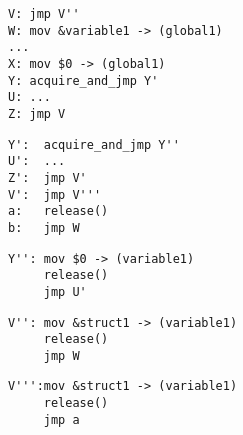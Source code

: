 \documentclass[10pt,letter,twocolumn]{sigplanconf}
\makeatletter
\newenvironment{subfloat}%
    {\def\caption##1{\gdef\subcapsave{\relax##1}}%
     \let\subcapsave=\@empty %
     \let\sf@oldlabel=\label
     \def\label##1{\xdef\sublabsave{\noexpand\label{##1}}}%
     \let\sublabsave\relax    %
     \setbox\subfigbox\hbox
       \bgroup}%
      {\egroup                %
     \let\label=\sf@oldlabel
     \subfigure[\subcapsave]{\box\subfigbox}}%
\makeatother
\begin{document}
\begin{figure}
  \begin{subfloat}
    \begin{minipage}{60mm}
\begin{verbatim}
V: jmp V''
W: mov &variable1 -> (global1)
...
X: mov $0 -> (global1)
Y: acquire_and_jmp Y'
U: ...
Z: jmp V
\end{verbatim}
    \end{minipage}
  \end{subfloat}
  \begin{subfloat}
    \begin{minipage}{50mm}
\begin{verbatim}
Y':  acquire_and_jmp Y''
U':  ...
Z':  jmp V'
V':  jmp V'''
a:   release()
b:   jmp W
\end{verbatim}
    \end{minipage}
  \end{subfloat}
  \begin{subfloat}
    \begin{minipage}{50mm}
\begin{verbatim}
Y'': mov $0 -> (variable1)
     release()
     jmp U'
\end{verbatim}
    \end{minipage}
  \end{subfloat}
  \begin{subfloat}
    \begin{minipage}{50mm}
\begin{verbatim}
V'': mov &struct1 -> (variable1)
     release()
     jmp W
\end{verbatim}
    \end{minipage}
  \end{subfloat}
  \begin{subfloat}
    \begin{minipage}{50mm}
\begin{verbatim}
V''':mov &struct1 -> (variable1)
     release()
     jmp a
\end{verbatim}
    \end{minipage}
  \end{subfloat}
  \caption{Complete patch based on the state machine in
    Figure~\ref{fig:specialise_taken}, extending
    Figure~\ref{fig:patch1}.}
  \label{fig:patch2}
\end{figure}
\end{document}
